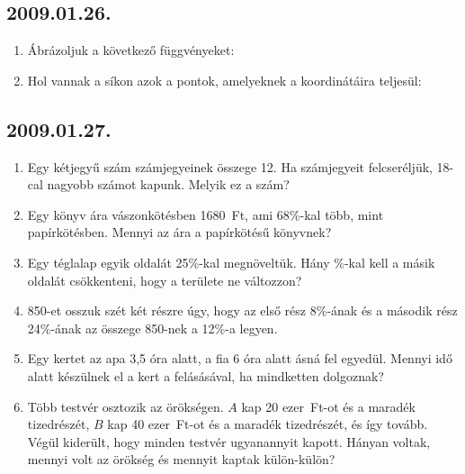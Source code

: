 \subsection*{2009.01.26.}
\begin{enumerate}
\item Ábrázoljuk a következő függvényeket:

\item Hol vannak a síkon azok a pontok, amelyeknek a koordinátáira teljesül:


\end{enumerate}

\subsection*{2009.01.27.}
\begin{enumerate}
\item Egy kétjegyű szám számjegyeinek összege 12. Ha számjegyeit felcseréljük, 18-cal nagyobb számot kapunk. Melyik ez a szám?
\item Egy könyv ára vászonkötésben 1680~Ft, ami 68\%-kal több, mint papírkötésben. Mennyi az ára a papírkötésű könyvnek?
\item Egy téglalap egyik oldalát 25\%-kal megnöveltük. Hány \%-kal kell a másik oldalát csökkenteni, hogy a területe ne változzon?
\item 850-et osszuk szét két részre úgy, hogy az első rész 8\%-ának és a második rész 24\%-ának az összege 850-nek a 12\%-a legyen.
\item Egy kertet az apa 3,5 óra alatt, a fia 6 óra alatt ásná fel egyedül. 
Mennyi idő alatt készülnek el a kert a felásásával, ha mindketten dolgoznak?
\item Több testvér osztozik az örökségen. $A$ kap 20 ezer~Ft-ot és a maradék tizedrészét, $B$ kap 40 ezer~Ft-ot és a maradék tizedrészét, és így tovább.
Végül kiderült, hogy minden testvér ugyanannyit kapott. Hányan voltak, mennyi volt az örökség és mennyit kaptak külön-külön?
\end{enumerate}


